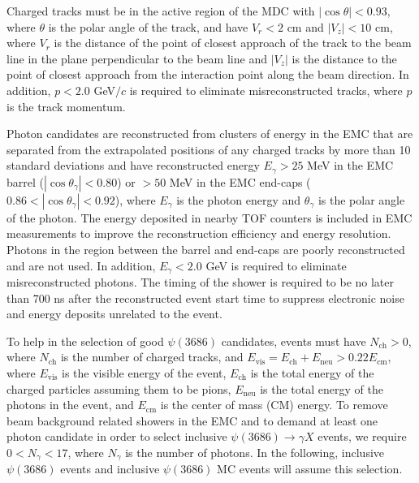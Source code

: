 \documentclass[aps,prd,twocolumn,showpacs,floatfix,byrevtex]{revtex4-1}
\begin{document}
Charged tracks must be in the active region of the MDC with $|\cos
\theta| < 0.93$, where $\theta$ is the polar angle of the track, and
have $V_r < 2$ cm and $|V_z| < 10$ cm, where $V_r$ is the distance of
the point of closest approach of the track to the beam line in the
plane perpendicular to the beam line and $|V_z|$ is the distance to
the point of closest approach from the interaction point along the
beam direction. In addition, $p < 2.0$ GeV$/c$ is required to eliminate
misreconstructed tracks, where $p$ is the track momentum.

Photon candidates are reconstructed from clusters of energy in the EMC
that are separated from the extrapolated positions of any charged
tracks by more than 10 standard deviations and have reconstructed
energy $E_{\gamma} > 25$ MeV in the EMC barrel ($|\cos
\theta_{\gamma}| < 0.80$) or $ > 50$ MeV in the EMC end-caps ($0.86 <
|\cos \theta_{\gamma}| < 0.92$), where $E_{\gamma}$ is the photon
energy and $\theta_{\gamma}$ is the polar angle of the photon.  The
energy deposited in nearby TOF counters is included in EMC
measurements to improve the reconstruction efficiency and energy
resolution.  Photons in the region between the barrel and end-caps are
poorly reconstructed and are not used.  In addition, $E_{\gamma} <
2.0$ GeV is required to eliminate misreconstructed photons.  The
timing of the shower is required to be no later than 700 ns after the
reconstructed event start time to suppress electronic noise and energy
deposits unrelated to the event.


To help in the selection of good $\psi(3686)$ candidates, events must
have $N_{\text{ch}} > 0$, where $N_{\text{ch}}$ is the number of
charged tracks, and $E_{\text{vis}} = E_{\text{ch}} + E_{\text{neu}} >
0.22E_{\text{cm}}$, where $E_{\text{vis}}$ is the visible energy of
the event, $E_{\text{ch}}$ is the total energy of the charged
particles assuming them to be pions, $E_{\text{neu}}$ is the total
energy of the photons in the event, and $E_{\text{cm}}$ is the center
of mass (CM) energy. To remove beam background related showers in the
EMC and to demand at least one photon candidate in order to select
inclusive $\psi(3686) \to \gamma X$ events, we require $0 < N_{\gamma}
< 17$, where $N_{\gamma}$ is the number of photons.  In the following,
inclusive $\psi(3686)$ events and inclusive $\psi(3686)$ MC events
will assume this selection.
\end{document}
